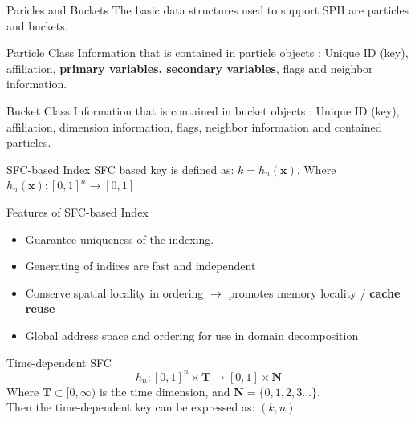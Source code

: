 \documentclass{beamer}
\begin{document}
\begin{frame}{Paricles and Buckets}
The basic data structures used to support SPH are particles and buckets. %
\begin{block}{Particle Class}
Information that is contained in particle objects :
Unique ID (key), affiliation, {\bf primary variables, secondary variables}, flags and neighbor information.
\end{block}
\begin{block}{Bucket Class}
Information that is contained in bucket objects :
Unique ID (key), affiliation, dimension information, flags, neighbor information and contained particles.
\end{block}
\end{frame}

\begin{frame}{SFC-based Index}
SFC based key is defined as: $k = h_n (\textbf{x})$, Where $h_n (\textbf{x}): [0,1]^n \rightarrow [0,1]$
\begin{block}{Features of SFC-based Index}
  \begin{itemize}
  \item {
    Guarantee uniqueness of the indexing.
  }
  \item {
    Generating of indices are fast and
independent
  }
  \item {
    Conserve spatial locality in ordering $\rightarrow$ promotes memory locality / {\bf cache reuse}
  }
  \item {
    Global address space and ordering for use in  domain decomposition
  }
  \end{itemize}
\end{block}

\begin{block}{Time-dependent SFC}
\begin{equation}
h_n: [0,1]^n \times \textbf{T} \rightarrow [0,1] \times \textbf{N}
\end{equation}
Where $\textbf{T} \subset [0,\infty)$ is the time dimension, and $\textbf{N}=\lbrace 0, 1, 2, 3...\rbrace$. \\
Then the time-dependent key can be expressed as: $(k,n)$
\end{block}
\end{frame}
\end{document}
